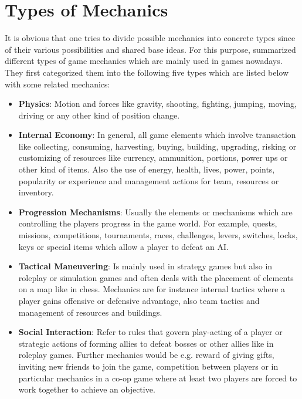 \documentclass[MGS,Master,english]{twbook}%
\begin{document}
\section{Types of Mechanics}
It is obvious that one tries to divide possible mechanics into concrete types since of their various possibilities and shared base ideas. For this purpose, \cite{gameDesign::gameMechanicsAdvancedGameDesign} summarized different types of game mechanics which are mainly used in games nowadays. They first categorized them into the following five types which are listed below with some related mechanics:
\begin{itemize}
	\item \textbf{Physics}: Motion and forces like gravity, shooting, fighting, jumping, moving, driving or any other kind of position change. \cite{gameDesign::gameMechanicsAdvancedGameDesign}
	\item \textbf{Internal Economy}: In general, all game elements which involve transaction like collecting, consuming, harvesting, buying, building, upgrading, risking or customizing of resources like currency, ammunition, portions, power ups or other kind of items. Also the use of energy, health, lives, power, points, popularity or experience and management actions for team, resources or inventory. \cite{gameDesign::gameMechanicsAdvancedGameDesign}
	\item \textbf{Progression Mechanisms}: Usually the elements or mechanisms which are controlling the players progress in the game world. For example, quests, missions, competitions, tournaments, races, challenges, levers, switches, locks, keys or special items which allow a player to defeat an AI. \cite{gameDesign::gameMechanicsAdvancedGameDesign}
	\item \textbf{Tactical Maneuvering}: Is mainly used in strategy games but also in roleplay or simulation games and often deals with the placement of elements on a map like in chess. Mechanics are for instance internal tactics where a player gains offensive or defensive advantage, also team tactics and management of resources and buildings. \cite{gameDesign::gameMechanicsAdvancedGameDesign}
	\item \textbf{Social Interaction}: Refer to rules that govern play-acting of a player or strategic actions of forming allies to defeat bosses or other allies like in roleplay games. Further mechanics would be e.g. reward of giving gifts, inviting new friends to join the game, competition between players or in particular mechanics in a co-op game where at least two players are forced to work together to achieve an objective. \cite{gameDesign::gameMechanicsAdvancedGameDesign}
\end{itemize}
\end{document}
